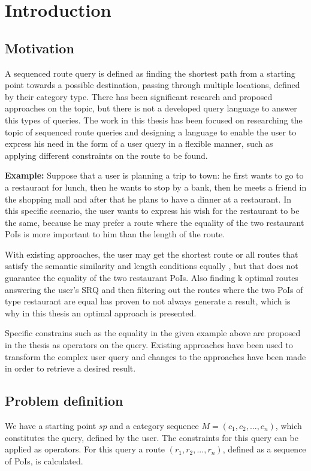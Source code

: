 \chapter{Introduction}
\label{sec:intro}

\section{Motivation}
A sequenced route query is defined as finding the shortest path from a starting point towards a possible destination, passing through multiple locations, defined by their category type. There has been significant research and proposed approaches on the topic, but there is not a developed query language to answer this types of queries. The work in this thesis has been focused on researching the topic of sequenced route queries and designing a language to enable the user to express his need in the form of a user query in a flexible manner, such as applying different constraints on the route to be found.

\textbf{Example:}
Suppose that a user is planning a trip to town: he first wants to go to a restaurant for lunch, then he wants to stop by a bank, then he meets a friend in the shopping mall and after that he plans to have a dinner at a restaurant. In this specific scenario, the user wants to express his wish for the restaurant to be the same, because he may prefer a route where the equality of the two restaurant PoIs is more important to him than the length of the route.

With existing approaches, the user may get the shortest route \cite{OSR} or all routes that satisfy the semantic similarity and length conditions equally \cite{semanticSRQ}, but that does not guarantee the equality of the two restaurant PoIs. Also finding k optimal routes answering the user's SRQ and then filtering out the routes where the two PoIs of type restaurant are equal has proven to not always generate a result, which is why in this thesis an optimal approach is presented.

Specific constrains such as the equality in the given example above are proposed in the thesis as operators on the query. Existing approaches have been used to transform the complex user query and changes to the approaches have been made in order to retrieve a desired result. 

\section{Problem definition}
We have a starting point $sp$ and a category sequence $M = (c_1, c_2, ..., c_n)$, which constitutes the query, defined by the user. The constraints for this query can be applied as operators.
For this query a route $(r_1, r_2, ..., r_n)$, defined as a sequence of PoIs, is calculated. \newline

